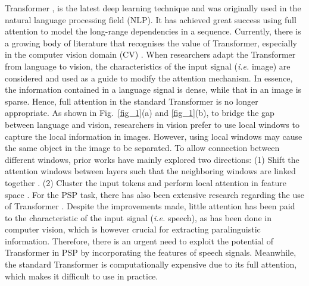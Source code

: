 \documentclass[lettersize,journal]{IEEEtran}
\begin{document}
Transformer \cite{Transformer}, is the latest deep learning technique and was originally used in the natural language processing field (NLP). It has achieved great success using full attention to model the long-range dependencies in a sequence. Currently, there is a growing body of literature that recognises the value of Transformer, especially in the computer vision domain (CV) \cite{ViT, Swin, cluster_vit, cluster_CVPR, ViT2, drop_vit}. When researchers adapt the Transformer from language to vision, the characteristics of the input signal (\textit{i.e.} image) are considered and used as a guide to modify the attention mechanism. In essence, the information contained in a language signal is dense, while that in an image is sparse. Hence, full attention in the standard Transformer is no longer appropriate. As shown in Fig.~\ref{fig_1}(a) and \ref{fig_1}(b), to bridge the gap between language and vision, researchers in vision prefer to use local windows to capture the local information in images. However, using local windows may cause the same object in the image to be separated. To allow connection between different windows, prior works have mainly explored two directions: (1) Shift the attention windows between layers such that the neighboring windows are linked together \cite{Swin}. (2) Cluster the input tokens and perform local attention in feature space \cite{cluster_vit, cluster_CVPR}. For the PSP task, there has also been extensive research regarding the use of Transformer \cite{Monica, ksT, speech_use_trans2, speech_use_trans3, ctnet, Tao2}. Despite the improvements made, little attention has been paid to the characteristic of the input signal (\textit{i.e.} speech), as has been done in computer vision, which is however crucial for extracting paralinguistic information. Therefore, there is an urgent need to exploit the potential of Transformer in PSP by incorporating the features of speech signals. Meanwhile, the standard Transformer is computationally expensive due to its full attention, which makes it difficult to use in practice.
\end{document}
